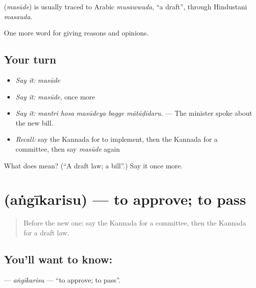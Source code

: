 \begin{cousinweb}
\textbf{} (\emph{masūde}) is usually traced to Arabic \emph{musawwada}, \textquotedblleft{}a draft\textquotedblright{}, through Hindustani \emph{masauda}.
\end{cousinweb}

\begin{grammarlens}[title={What you've built}]
One more word for giving reasons and opinions.
\end{grammarlens}

\subsection*{Your turn}
\begin{itemize}
\raggedright
  \item \emph{Say it:} \emph{masūde}
  \item \emph{Say it:} \emph{masūde}, once more
  \item \emph{Say it:} \emph{mantri hosa masūdeya bagge mātāḍidaru.} — The minister spoke about the new bill.
  \item \emph{Recall:} say the Kannada for to implement, then the Kannada for a committee, then say \emph{masūde} again
\end{itemize}

\begin{tcolorbox}[breakable,colback=teal!4,colframe=teal!35!black,title={Before you move on}]
What does  mean? (\textquotedblleft{}A draft law; a bill\textquotedblright{}.) Say it once more.
\end{tcolorbox}
\section[\texorpdfstring{\kn{ಅಂಗೀಕರಿಸು} (aṅgīkarisu)}{ಅಂಗೀಕರಿಸು (aṅgīkarisu)}]{ (aṅgīkarisu) — to approve; to pass}

\label{lesson:KA-C396-angikarisu}



\begin{quote}
Before the new one: say the Kannada for a committee, then the Kannada for a draft law.
\end{quote}

\subsection*{You'll want to know: }
\textbf{} — \emph{aṅgīkarisu} — \textquotedblleft{}to approve; to pass\textquotedblright{}.

